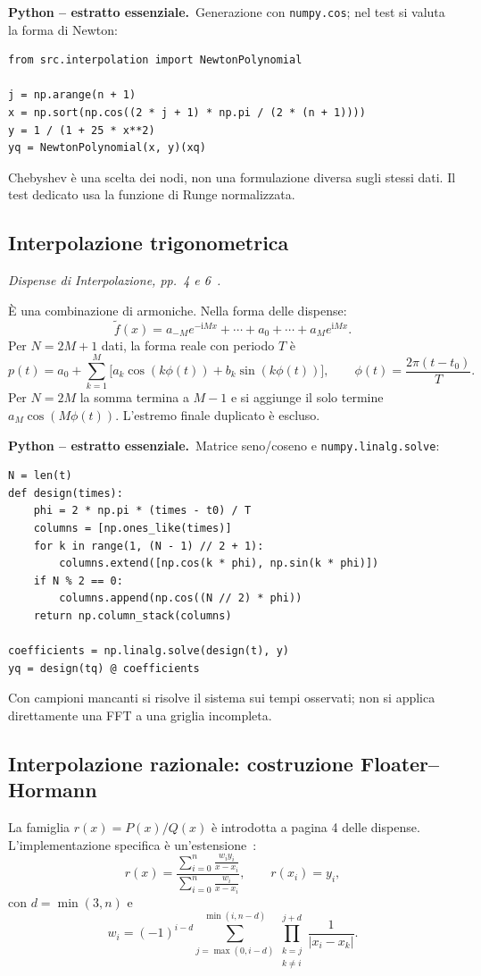 \documentclass[11pt,a4paper]{article}
\newcommand{\slides}[1]{\textit{Dispense di Interpolazione, pp.~#1~\cite{dispense}.}}
\newcommand{\python}{\textbf{Python -- estratto essenziale.}}
\numberwithin{equation}{section}
\begin{document}
\python\ Generazione con \texttt{numpy.cos}; nel test si valuta la
forma di Newton:
\begin{lstlisting}
from src.interpolation import NewtonPolynomial

j = np.arange(n + 1)
x = np.sort(np.cos((2 * j + 1) * np.pi / (2 * (n + 1))))
y = 1 / (1 + 25 * x**2)
yq = NewtonPolynomial(x, y)(xq)
\end{lstlisting}
Chebyshev è una scelta dei nodi, non una formulazione diversa sugli
stessi dati. Il test dedicato usa la funzione di Runge normalizzata.

\subsection{Interpolazione trigonometrica}
\slides{4 e 6}

È una combinazione di armoniche. Nella forma delle dispense:
\begin{equation}
 \widetilde f(x)=a_{-M}e^{-\mathrm{i}Mx}+\cdots+a_0+\cdots+a_Me^{\mathrm{i}Mx}.
\end{equation}
Per $N=2M+1$ dati, la forma reale con periodo $T$ è
\begin{equation}
 p(t)=a_0+\sum_{k=1}^{M}\bigl[a_k\cos(k\phi(t))+b_k\sin(k\phi(t))\bigr],
 \qquad \phi(t)=\frac{2\pi(t-t_0)}{T}.
\end{equation}
Per $N=2M$ la somma termina a $M-1$ e si aggiunge il solo termine
$a_M\cos(M\phi(t))$. L'estremo finale duplicato è escluso.

\python\ Matrice seno/coseno e \texttt{numpy.linalg.solve}:
\begin{lstlisting}
N = len(t)
def design(times):
    phi = 2 * np.pi * (times - t0) / T
    columns = [np.ones_like(times)]
    for k in range(1, (N - 1) // 2 + 1):
        columns.extend([np.cos(k * phi), np.sin(k * phi)])
    if N % 2 == 0:
        columns.append(np.cos((N // 2) * phi))
    return np.column_stack(columns)

coefficients = np.linalg.solve(design(t), y)
yq = design(tq) @ coefficients
\end{lstlisting}
Con campioni mancanti si risolve il sistema sui tempi osservati;
non si applica direttamente una FFT a una griglia incompleta.

\subsection{Interpolazione razionale: costruzione Floater--Hormann}
La famiglia $r(x)=P(x)/Q(x)$ è introdotta a pagina 4 delle dispense.
L'implementazione specifica è un'estensione~\cite{floater-hormann}:
\begin{equation}
 r(x)=\frac{\displaystyle\sum_{i=0}^{n}\frac{w_i y_i}{x-x_i}}
 {\displaystyle\sum_{i=0}^{n}\frac{w_i}{x-x_i}},\qquad r(x_i)=y_i,
\end{equation}
con $d=\min(3,n)$ e
\begin{equation}
 w_i=(-1)^{i-d}\sum_{j=\max(0,i-d)}^{\min(i,n-d)}
 \prod_{\substack{k=j\\k\ne i}}^{j+d}\frac{1}{|x_i-x_k|}.
\end{equation}
\end{document}
